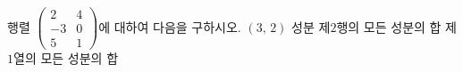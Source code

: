 \hspace*{2mm}\begin{minipage}[t]{\dimexpr\linewidth-2mm\relax}\vspace{0pt}
행렬 $\begin{pmatrix} 2 & 4 \\ -3 & 0 \\ 5 & 1 \end{pmatrix}$에 대하여 다음을 구하시오.
 $(3,\,2)$ 성분
 제$2$행의 모든 성분의 합
 제$1$열의 모든 성분의 합\end{minipage}
